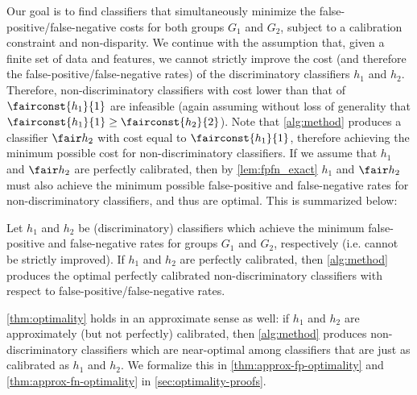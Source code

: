 Our goal is to find classifiers that simultaneously minimize the
false-positive/false-negative costs for both groups $G_1$ and $G_2$, subject to a
calibration constraint and non-disparity.
We continue with the assumption that, given a finite set of data and features,
we cannot strictly improve the cost (and therefore the
false-positive/false-negative rates) of the discriminatory classifiers $h_1$ and $h_2$.
Therefore, non-discriminatory classifiers with cost lower than that of
$\fairconst{h_1}{1}$ are infeasible (again assuming without loss of
generality that $\fairconst{h_1}{1} \geq \fairconst{h_2}{2}$).
Note that \autoref{alg:method} produces a classifier $\fair h_2$ with cost equal
to $\fairconst{h_1}{1}$, therefore achieving the minimum possible
cost for non-discriminatory classifiers. If we assume that $h_1$ and $\fair h_2$
are perfectly calibrated, then by \autoref{lem:fpfn_exact} $h_1$ and $\fair h_2$
must also achieve the minimum possible false-positive and false-negative rates
for non-discriminatory classifiers, and thus are optimal. This is summarized below:
%
\begin{thm}
  Let $h_1$ and $h_2$ be (discriminatory) classifiers which achieve the
  minimum false-positive and false-negative rates for groups $G_1$ and $G_2$, respectively
  (i.e. cannot be strictly improved).
  If $h_1$ and $h_2$ are perfectly calibrated, then \autoref{alg:method} produces
  the optimal perfectly calibrated non-discriminatory classifiers with respect
  to false-positive/false-negative rates.
  \label{thm:optimality}
\end{thm}
%
\autoref{thm:optimality} holds in an approximate sense as well:
if $h_1$ and $h_2$ are approximately (but not perfectly) calibrated, then
\autoref{alg:method} produces non-discriminatory classifiers which are
near-optimal among classifiers that are just as calibrated as $h_1$ and $h_2$.
We formalize this in \autoref{thm:approx-fp-optimality} and
\autoref{thm:approx-fn-optimality} in \autoref{sec:optimality-proofs}.


